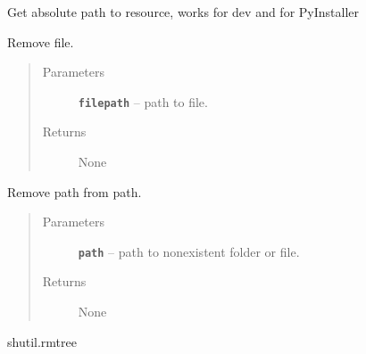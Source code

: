 \documentclass[letterpaper,10pt,english]{sphinxmanual}
\begin{document}
\begin{fulllineitems}
\end{fulllineitems}


\begin{fulllineitems}
\label{RRtoolbox.lib:RRtoolbox.lib.directory.resource_path}
Get absolute path to resource, works for dev and for PyInstaller

\end{fulllineitems}


\begin{fulllineitems}
\label{RRtoolbox.lib:RRtoolbox.lib.directory.rmFile}
Remove file.
\begin{quote}\begin{description}
\item[{Parameters}] \leavevmode
\textbf{\texttt{filepath}} -- path to file.

\item[{Returns}] \leavevmode
None

\end{description}\end{quote}

\end{fulllineitems}


\begin{fulllineitems}
\label{RRtoolbox.lib:RRtoolbox.lib.directory.rmPath}
Remove path from path.
\begin{quote}\begin{description}
\item[{Parameters}] \leavevmode
\textbf{\texttt{path}} -- path to nonexistent folder or file.

\item[{Returns}] \leavevmode
None

\end{description}\end{quote}




shutil.rmtree



\end{fulllineitems}
\end{document}
